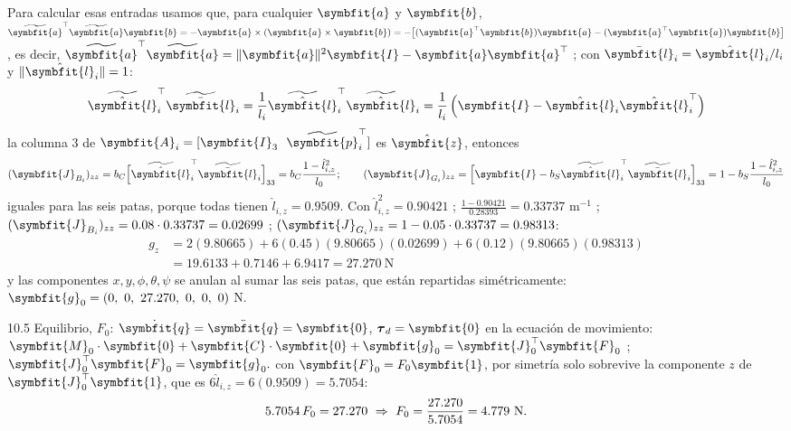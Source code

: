 \documentclass[11pt,a4paper]{article}
\makeatletter
\numberwithin{equation}{section}
\renewcommand\paragraph{\@startsection{paragraph}{4}{\z@}{1.4ex plus .4ex}{-0.6em}%
  {\normalfont\color{tinta}}}
\newcommand{\vect}[1]{\symbfit{#1}}
\newcommand{\T}{^{\top}}
\newcommand{\sk}[1]{\widetilde{#1}}
\makeatother
\begin{document}
Para calcular esas entradas usamos que, para cualquier $\vect a$ y $\vect b$, $\sk{\vect a}\T\sk{\vect a}\vect b = -\vect a\times(\vect a\times\vect b) = -\bigl[(\vect a\T\vect b)\vect a - (\vect a\T\vect a)\vect b\bigr]$, es decir, $\sk{\vect a}\T\sk{\vect a} = \lVert\vect a\rVert^2\vect I - \vect a\vect a\T$ ; con $\bar{\vect l}_i = \hat{\vect l}_i/l_i$ y $\lVert\hat{\vect l}_i\rVert = 1$:
\[
\sk{\hat{\vect l}}_i\T\sk{\bar{\vect l}}_i = \frac1{l_i}\sk{\hat{\vect l}}_i\T\sk{\hat{\vect l}}_i = \frac1{l_i}\left(\vect I - \hat{\vect l}_i\hat{\vect l}_i\T\right)
\]
la columna 3 de $\vect A_i = [\vect I_3\ \ \sk{\vect p}_i\T]$ es $\hat{\vect z}$, entonces
\[
(\vect J_{B_i})_{zz} = b_C\Bigl[\sk{\hat{\vect l}}_i\T\sk{\bar{\vect l}}_i\Bigr]_{33} = b_C\frac{1 - \hat l_{i,z}^2}{l_0} ;\qquad (\vect J_{G_i})_{zz} = \Bigl[\vect I - b_S\sk{\hat{\vect l}}_i\T\sk{\bar{\vect l}}_i\Bigr]_{33} = 1 - b_S\frac{1 - \hat l_{i,z}^2}{l_0}
\]
iguales para las seis patas, porque todas tienen $\hat l_{i,z} = 0.9509$. Con $\hat l_{i,z}^2 = 0.90421$ ; $\frac{1 - 0.90421}{0.28393} = 0.33737$ m$^{-1}$ ; $(\vect J_{B_i})_{zz} = 0.08\cdot0.33737 = 0.02699$ ; $(\vect J_{G_i})_{zz} = 1 - 0.05\cdot0.33737 = 0.98313$:
\begin{equation*}
\begin{aligned}g_z &= 2(9.80665) + 6(0.45)(9.80665)(0.02699) + 6(0.12)(9.80665)(0.98313)\\ &= 19.6133 + 0.7146 + 6.9417 = 27.270\ \text{N}\end{aligned}
\end{equation*}
y las componentes $x, y, \phi, \theta, \psi$ se anulan al sumar las seis patas, que están repartidas simétricamente: $\vect g_0 = (0,\ 0,\ 27.270,\ 0,\ 0,\ 0)$ N.

\paragraph{10.5 Equilibrio, $F_0$:} $\dot{\vect q} = \ddot{\vect q} = \vect 0$, $\boldsymbol\tau_d = \vect 0$ en la ecuación de movimiento:
$\displaystyle \vect M_0\cdot\vect 0 + \vect C\cdot\vect 0 + \vect g_0  = \vect J_0\T\vect F_0$ ; $\displaystyle \vect J_0\T\vect F_0  = \vect g_0 .$
con $\vect F_0 = F_0\vect 1$, por simetría solo sobrevive la componente $z$ de $\vect J_0\T\vect 1$, que es $6\hat l_{i,z} = 6(0.9509) = 5.7054$:
\begin{equation*}
5.7054\,F_0 = 27.270 \ \Rightarrow\ F_0 = \frac{27.270}{5.7054} = 4.779\ \text{N}.
\end{equation*}
\end{document}
